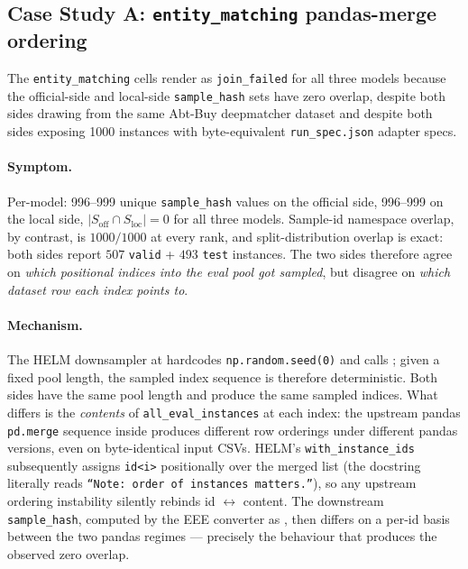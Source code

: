 \subsection{Case Study A: \texorpdfstring{\texttt{entity\_matching}}{entity\_matching} pandas-merge ordering}
\label{sec:app-helm-em-v2}

The \texttt{entity\_matching} cells render as \texttt{join\_failed}
  for all three models because the official-side and local-side
  \texttt{sample\_hash} sets have zero overlap, despite both sides
  drawing from the same Abt-Buy deepmatcher dataset and despite both
  sides exposing 1000 instances with byte-equivalent
  \texttt{run\_spec.json} adapter specs.

\paragraph{Symptom.}
Per-model: 996--999 unique \texttt{sample\_hash} values on the official
  side, 996--999 on the local side, $|S_\text{off} \cap S_\text{loc}| = 0$
  for all three models.
Sample-id namespace overlap, by contrast, is $1000/1000$ at every
  rank, and split-distribution overlap is exact: both sides report
  $507$ \texttt{valid} + $493$ \texttt{test} instances.
The two sides therefore agree on \emph{which positional indices into
  the eval pool got sampled}, but disagree on \emph{which
  dataset row each index points to}.

\paragraph{Mechanism.}
The HELM downsampler at
  hardcodes \texttt{np.random.seed(0)} and calls
  ; given a fixed pool length, the sampled index
  sequence is therefore deterministic.
Both sides have the same pool length and produce the same sampled
  indices.
What differs is the \emph{contents} of \texttt{all\_eval\_instances} at
  each index: the upstream pandas \texttt{pd.merge} sequence inside
   produces
  different row orderings under different pandas versions, even on
  byte-identical input CSVs.
HELM's \texttt{with\_instance\_ids} subsequently assigns
  \texttt{id<i>} positionally over the merged list (the docstring
  literally reads \texttt{``Note: order of instances matters.''}), so
  any upstream ordering instability silently rebinds id $\leftrightarrow$ content.
The downstream \texttt{sample\_hash}, computed by the EEE converter as
  , then differs
  on a per-id basis between the two pandas regimes — precisely the
  behaviour that produces the observed zero overlap.

